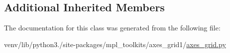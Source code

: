 \subsection*{Additional Inherited Members}


The documentation for this class was generated from the following file\+:\begin{DoxyCompactItemize}
\item 
venv/lib/python3./site-\/packages/mpl\+\_\+toolkits/axes\+\_\+grid1/\hyperlink{axes__grid1_2axes__grid_8py}{axes\+\_\+grid.\+py}\end{DoxyCompactItemize}
